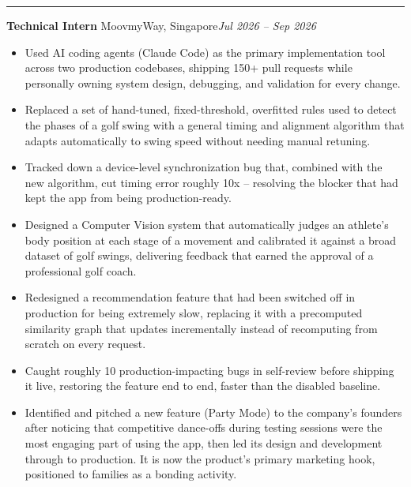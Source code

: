 \documentclass[11pt]{article}
\newcommand{\cvsection}[1]{%
  \vspace{10pt}%
  \noindent{\large\bfseries\MakeUppercase{#1}}\par
  \vspace{-4pt}\noindent\rule{\linewidth}{0.7pt}\vspace{4pt}%
}
\begin{document}
\cvsection{Experience}
\noindent\textbf{Technical Intern} MoovmyWay, Singapore\hfill\textit{Jul 2026 -- Sep 2026}\par
\begin{itemize}
  \item Used AI coding agents (Claude Code) as the primary implementation tool across two production codebases, shipping 150+ pull requests while personally owning system design, debugging, and validation for every change.
  \item Replaced a set of hand-tuned, fixed-threshold, overfitted rules used to detect the phases of a golf swing with a general timing and alignment algorithm that adapts automatically to swing speed without needing manual retuning.
  \item Tracked down a device-level synchronization bug that, combined with the new algorithm, cut timing error roughly 10x -- resolving the blocker that had kept the app from being production-ready.
  \item Designed a Computer Vision system that automatically judges an athlete's body position at each stage of a movement and calibrated it against a broad dataset of golf swings, delivering feedback that earned the approval of a professional golf coach.
  \item Redesigned a recommendation feature that had been switched off in production for being extremely slow, replacing it with a precomputed similarity graph that updates incrementally instead of recomputing from scratch on every request.
  \item Caught roughly 10 production-impacting bugs in self-review before shipping it live, restoring the feature end to end, faster than the disabled baseline.
  \item Identified and pitched a new feature (Party Mode) to the company's founders after noticing that competitive dance-offs during testing sessions were the most engaging part of using the app, then led its design and development through to production. It is now the product's primary marketing hook, positioned to families as a bonding activity.
\end{itemize}
\end{document}
